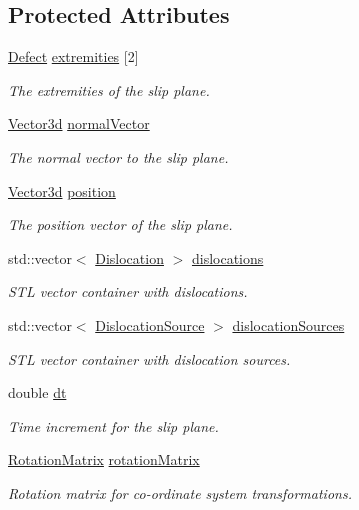 \subsection*{\-Protected \-Attributes}
\begin{DoxyCompactItemize}
\item 
\hyperlink{classDefect}{\-Defect} \hyperlink{classSlipPlane_abbdbe6ed805faf3777b54ff55a9c089c}{extremities} \mbox{[}2\mbox{]}
\begin{DoxyCompactList}\small\item\em \-The extremities of the slip plane. \end{DoxyCompactList}\item 
\hyperlink{classVector3d}{\-Vector3d} \hyperlink{classSlipPlane_aad33ce7b595e5fc55aefe51c7b0957f2}{normal\-Vector}
\begin{DoxyCompactList}\small\item\em \-The normal vector to the slip plane. \end{DoxyCompactList}\item 
\hyperlink{classVector3d}{\-Vector3d} \hyperlink{classSlipPlane_ac2ac59e22e9638a990c9e45aaa096d9a}{position}
\begin{DoxyCompactList}\small\item\em \-The position vector of the slip plane. \end{DoxyCompactList}\item 
std\-::vector$<$ \hyperlink{classDislocation}{\-Dislocation} $>$ \hyperlink{classSlipPlane_ad92c7c409f7e161db449528389180910}{dislocations}
\begin{DoxyCompactList}\small\item\em \-S\-T\-L vector container with dislocations. \end{DoxyCompactList}\item 
std\-::vector$<$ \hyperlink{classDislocationSource}{\-Dislocation\-Source} $>$ \hyperlink{classSlipPlane_a8e31e904fc6e68cc7ba70b0b57a278cc}{dislocation\-Sources}
\begin{DoxyCompactList}\small\item\em \-S\-T\-L vector container with dislocation sources. \end{DoxyCompactList}\item 
double \hyperlink{classSlipPlane_ad786135547799363ad2931e43522c2be}{dt}
\begin{DoxyCompactList}\small\item\em \-Time increment for the slip plane. \end{DoxyCompactList}\item 
\hyperlink{classRotationMatrix}{\-Rotation\-Matrix} \hyperlink{classSlipPlane_a1aa5aacccb6bb03d163a95251aa10d6c}{rotation\-Matrix}
\begin{DoxyCompactList}\small\item\em \-Rotation matrix for co-\/ordinate system transformations. \end{DoxyCompactList}\end{DoxyCompactItemize}


